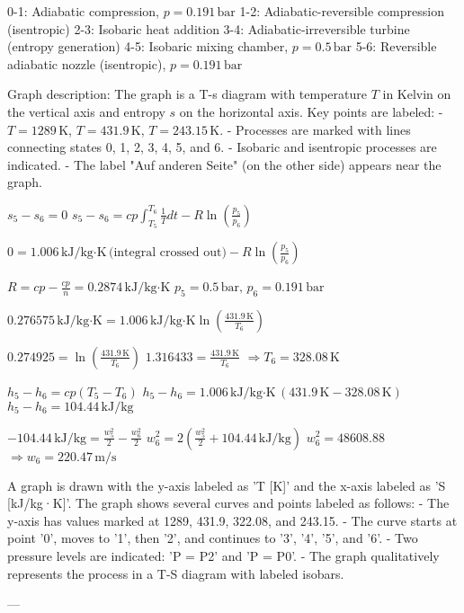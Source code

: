 0-1: Adiabatic compression, \( p = 0.191 \, \text{bar} \)  
1-2: Adiabatic-reversible compression (isentropic)  
2-3: Isobaric heat addition  
3-4: Adiabatic-irreversible turbine (entropy generation)  
4-5: Isobaric mixing chamber, \( p = 0.5 \, \text{bar} \)  
5-6: Reversible adiabatic nozzle (isentropic), \( p = 0.191 \, \text{bar} \)  

Graph description:  
The graph is a T-s diagram with temperature \( T \) in Kelvin on the vertical axis and entropy \( s \) on the horizontal axis.  
Key points are labeled:  
- \( T = 1289 \, \text{K} \), \( T = 431.9 \, \text{K} \), \( T = 243.15 \, \text{K} \).  
- Processes are marked with lines connecting states 0, 1, 2, 3, 4, 5, and 6.  
- Isobaric and isentropic processes are indicated.  
- The label "Auf anderen Seite" (on the other side) appears near the graph.

\( s_5 - s_6 = 0 \)  
\( s_5 - s_6 = cp \int_{T_5}^{T_6} \frac{1}{T} dt - R \ln \left( \frac{p_5}{p_6} \right) \)  

\( 0 = 1.006 \, \text{kJ/kg·K} \, \text{(integral crossed out)} - R \ln \left( \frac{p_5}{p_6} \right) \)  

\( R = cp - \frac{cp}{n} = 0.2874 \, \text{kJ/kg·K} \)  
\( p_5 = 0.5 \, \text{bar}, \, p_6 = 0.191 \, \text{bar} \)  

\( 0.276575 \, \text{kJ/kg·K} = 1.006 \, \text{kJ/kg·K} \ln \left( \frac{431.9 \, \text{K}}{T_6} \right) \)  

\( 0.274925 = \ln \left( \frac{431.9 \, \text{K}}{T_6} \right) \)  
\( 1.316433 = \frac{431.9 \, \text{K}}{T_6} \)  
\( \Rightarrow T_6 = 328.08 \, \text{K} \)  

\( h_5 - h_6 = cp (T_5 - T_6) \)  
\( h_5 - h_6 = 1.006 \, \text{kJ/kg·K} \, (431.9 \, \text{K} - 328.08 \, \text{K}) \)  
\( h_5 - h_6 = 104.44 \, \text{kJ/kg} \)  

\( -104.44 \, \text{kJ/kg} = \frac{w_5^2}{2} - \frac{w_6^2}{2} \)  
\( w_6^2 = 2 \left( \frac{w_5^2}{2} + 104.44 \, \text{kJ/kg} \right) \)  
\( w_6^2 = 48608.88 \)  
\( \Rightarrow w_6 = 220.47 \, \text{m/s} \)

A graph is drawn with the y-axis labeled as 'T [K]' and the x-axis labeled as 'S [kJ/kg·K]'. The graph shows several curves and points labeled as follows:  
- The y-axis has values marked at 1289, 431.9, 322.08, and 243.15.  
- The curve starts at point '0', moves to '1', then '2', and continues to '3', '4', '5', and '6'.  
- Two pressure levels are indicated: 'P = P2' and 'P = P0'.  
- The graph qualitatively represents the process in a T-S diagram with labeled isobars.  

---